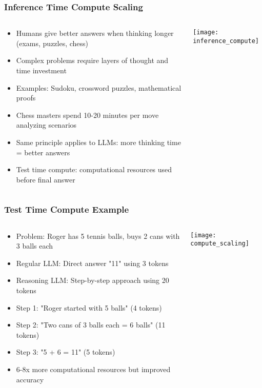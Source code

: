 \begin{frame}[fragile]\frametitle{Inference Time Compute Scaling}
\begin{columns}
    \begin{column}[T]{0.6\linewidth}
      \begin{itemize}
        \item Humans give better answers when thinking longer (exams, puzzles, chess)
        \item Complex problems require layers of thought and time investment
        \item Examples: Sudoku, crossword puzzles, mathematical proofs
        \item Chess masters spend 10-20 minutes per move analyzing scenarios
        \item Same principle applies to LLMs: more thinking time = better answers
        \item Test time compute: computational resources used before final answer
      \end{itemize}
    \end{column}
    \begin{column}[T]{0.4\linewidth}
        \begin{center}
        \texttt{[image: inference\_compute]}
        \end{center}	
    \end{column}
  \end{columns}
\end{frame}

\begin{frame}[fragile]\frametitle{Test Time Compute Example}
\begin{columns}
    \begin{column}[T]{0.6\linewidth}
      \begin{itemize}
        \item Problem: Roger has 5 tennis balls, buys 2 cans with 3 balls each
        \item Regular LLM: Direct answer "11" using 3 tokens
        \item Reasoning LLM: Step-by-step approach using 20 tokens
        \item Step 1: "Roger started with 5 balls" (4 tokens)
        \item Step 2: "Two cans of 3 balls each = 6 balls" (11 tokens)
        \item Step 3: "5 + 6 = 11" (5 tokens)
        \item 6-8x more computational resources but improved accuracy
      \end{itemize}
    \end{column}
    \begin{column}[T]{0.4\linewidth}
        \begin{center}
        \texttt{[image: compute\_scaling]}
        \end{center}	
    \end{column}
  \end{columns}
\end{frame}

